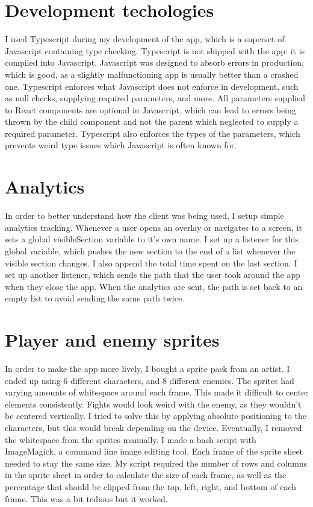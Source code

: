 \documentclass{l4proj}
\begin{document}
\section{Development techologies}
I used Typescript during my development of the app, which is a superset of Javascript containing type checking. Typescript is not shipped with the app: it is compiled into Javascript. Javascript was designed to absorb errors in production, which is good, as a slightly malfunctioning app is usually better than a crashed one. Typescript enforces what Javascript does not enforce in development, such as null checks, supplying required parameters, and more. All parameters supplied to React components are optional in Javascript, which can lead to errors being thrown by the child component and not the parent which neglected to supply a required parameter. Typescript also enforces the types of the parameters, which prevents weird type issues which Javascript is often known for.

\section{Analytics}
In order to better understand how the client was being used, I setup simple analytics tracking. Whenever a user opens an overlay or navigates to a screen, it sets a global visibleSection variable to it's own name. I set up a listener for this global variable, which pushes the new section to the end of a list whenever the visible section changes. I also append the total time spent on the last section. I set up another listener, which sends the path that the user took around the app when they close the app. When the analytics are sent, the path is set back to an empty list to avoid sending the same path twice.

\section{Player and enemy sprites}
In order to make the app more lively, I bought a sprite pack from an artist. I ended up using 6 different characters, and 8 different enemies. The sprites had varying amounts of whitespace around each frame. This made it difficult to center elements consistently. Fights would look weird with the enemy, as they wouldn't be centered vertically. I tried to solve this by applying absolute positioning to the characters, but this would break depending on the device. Eventually, I removed the whitespace from the sprites manually. I made a bash script with ImageMagick, a command line image editing tool. Each frame of the sprite sheet needed to stay the same size. My script required the number of rows and columns in the sprite sheet in order to calculate the size of each frame, as well as the percentage that should be clipped from the top, left, right, and bottom of each frame. This was a bit tedious but it worked.
\end{document}

